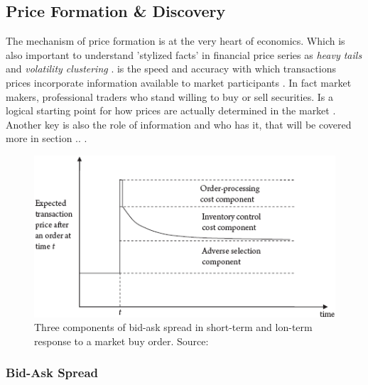 \documentclass{kththesis}
\theoremstyle{definition}
\begin{document}
\subsection{Price Formation \& Discovery}

The mechanism of price formation is at the very heart of economics.  Which is also important to understand 'stylized facts' in financial price series as \textit{heavy tails} and \textit{volatility clustering}  \parencite{abergel2012market}.  is the speed and accuracy with which transactions prices incorporate information available to market participants \parencite{foucault2013market}. In fact market makers, professional traders who stand willing to buy or sell securities. Is a logical starting point for how prices are actually determined in the market \parencite{madhavan2000market}. Another key is also the role of information and who has it, that will be covered more in section .. \parencite{cartea2015algorithmic}.


\begin{figure}[H]
    \centering
    \includegraphics[scale=1]{bidask.png}
    \caption{Three components of bid-ask spread in short-term and lon-term response to a market buy order. Source: \textcite{foucault2013market}}
    \label{fig:3}
\end{figure}


\subsubsection*{Bid-Ask Spread}
\end{document}
